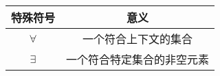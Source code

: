 
\begin{table}[h]

\centering

\begin{tabular}{cc}

\toprule

特殊符号 
&
意义
\\

\midrule

$\forall$ %
&
一个符合上下文的集合
\\

$\exists$ %
&
一个符合特定集合的非空元素
\\

\bottomrule

\end{tabular}

\end{table}



















